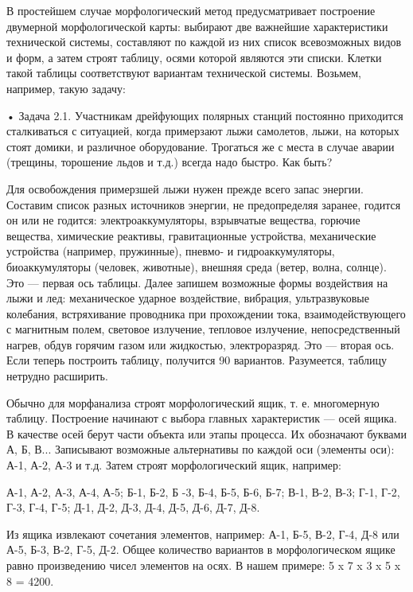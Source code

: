 В простейшем  случае морфологический метод  предусматривает построение
двумерной морфологической карты: выбирают две важнейшие характеристики
технической системы,  составляют по каждой из  них список всевозможных
видов  и форм,  а затем  строят  таблицу, осями  которой являются  эти
списки.  Клетки  такой  таблицы  соответствуют  вариантам  технической
системы. Возьмем, например, такую задачу:

•  Задача  2.1.  Участникам   дрейфующих  полярных  станций  постоянно
приходится сталкиваться с ситуацией,  когда примерзают лыжи самолетов,
лыжи, на которых стоят домики,  и различное оборудование. Трогаться же
с места в случае аварии (трещины,  торошение льдов и т.д.) всегда надо
быстро. Как быть?


Для  освобождения примерзшей  лыжи нужен  прежде всего  запас энергии.
Составим   список   разных   источников  энергии,   не   предопределяя
заранее, годится  он или  не годится:  электроаккумуляторы, взрывчатые
вещества,  горючие   вещества,  химические   реактивы,  гравитационные
устройства,  механические  устройства (например,  пружинные),  пневмо-
и  гидроаккумуляторы,  биоаккумуляторы  (человек,  животные),  внешняя
среда  (ветер,  волна,  солнце).  Это  —  первая  ось  таблицы.  Далее
запишем  возможные  формы  воздействия  на лыжи  и  лед:  механическое
ударное воздействие, вибрация,  ультразвуковые колебания, встряхивание
проводника при прохождении тока, взаимодействующего с магнитным полем,
световое излучение, тепловое излучение, непосредственный нагрев, обдув
горячим газом  или жидкостью,  электроразряд. Это  — вторая  ось. Если
теперь построить таблицу, получится  90 вариантов. Разумеется, таблицу
нетрудно расширить.

Обычно для морфанализа строят  морфологический ящик, т. е. многомерную
таблицу.  Построение начинают  с выбора  главных характеристик  — осей
ящика.  В качестве  осей берут  части объекта  или этапы  процесса. Их
обозначают  буквами А,  Б, В...  Записывают возможные  альтернативы по
каждой  оси  (элементы  оси):  А-1,  А-2,  А-3  и  т.д.  Затем  строят
морфологический ящик, например:

А-1, А-2, А-3, А-4, А-5;
Б-1, Б-2, Б -3, Б-4, Б-5, Б-6, Б-7;
В-1, В-2, В-3;
Г-1, Г-2, Г-3, Г-4, Г-5;
Д-1, Д-2, Д-3, Д-4, Д-5, Д-6, Д-7, Д-8.

Из ящика извлекают сочетания элементов,  например: А-1, Б-5, В-2, Г-4,
Д-8  или  А-5,  Б-3,  В-2,  Г-5, Д-2.  Общее  количество  вариантов  в
морфологическом ящике  равно произведению  чисел элементов на  осях. В
нашем примере: 5 x 7 x 3 x 5 x 8 = 4200.


